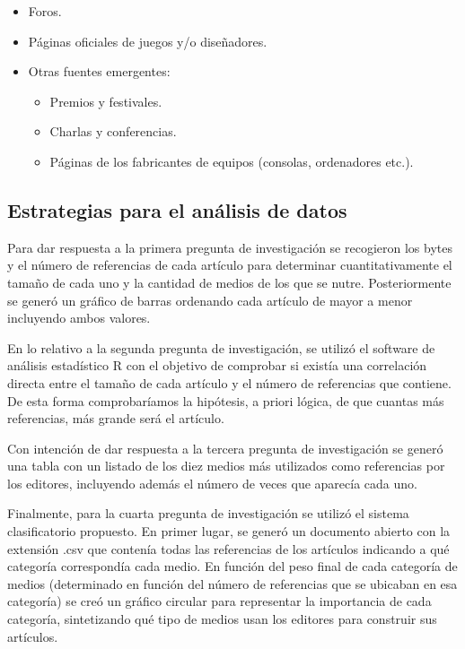 \documentclass[spanish]{textolivre}
\begin{document}
\begin{itemize}
    \item Foros.
    \item Páginas oficiales de juegos y/o diseñadores.
    \item Otras fuentes emergentes:
    \begin{itemize}
        \item Premios y festivales.
        \item Charlas y conferencias.
        \item Páginas de los fabricantes de equipos (consolas, ordenadores etc.).
    \end{itemize}
\end{itemize}






\subsection{Estrategias para el análisis de datos}
Para dar respuesta a la primera pregunta de investigación se recogieron los bytes y el número de referencias de cada artículo para determinar cuantitativamente el tamaño de cada uno y la cantidad de medios de los que se nutre. Posteriormente se generó un gráfico de barras ordenando cada artículo de mayor a menor incluyendo ambos valores.

En lo relativo a la segunda pregunta de investigación, se utilizó el software de análisis estadístico R con el objetivo de comprobar si existía una correlación directa entre el tamaño de cada artículo y el número de referencias que contiene. De esta forma comprobaríamos la hipótesis, a priori lógica, de que cuantas más referencias, más grande será el artículo.

Con intención de dar respuesta a la tercera pregunta de investigación se generó una tabla con un listado de los diez medios más utilizados como referencias por los editores, incluyendo además el número de veces que aparecía cada uno.

Finalmente, para la cuarta pregunta de investigación se utilizó el sistema clasificatorio propuesto. En primer lugar, se generó un documento abierto con la extensión .csv que contenía todas las referencias de los artículos indicando a qué categoría correspondía cada medio. En función del peso final de cada categoría de medios (determinado en función del número de referencias que se ubicaban en esa categoría) se creó un gráfico circular para representar la importancia de cada categoría, sintetizando qué tipo de medios usan los editores para construir sus artículos.
\end{document}
